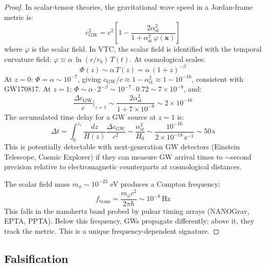 \documentclass[11pt,a4paper]{article}
\theoremstyle{definition}
\begin{document}
\begin{proof}
In scalar-tensor theories, the gravitational wave speed in a Jordan-frame metric is:
\begin{equation}
c_\mathrm{GW}^2 = c^2\left[1 - \frac{2\alpha_\mathrm{st}^2}{1 + \alpha_\mathrm{st}^2\,\varphi(\mathbf{x})}\right]
\end{equation}
where $\varphi$ is the scalar field. In VTC, the scalar field is identified with the temporal curvature field: $\varphi \equiv \alpha\,\ln(r/r_0)\,T(t)$. At cosmological scales:
\begin{equation}
\Phi(z) \sim \alpha\,T(z) = \alpha\,(1+z)^{-\beta}
\end{equation}
At $z = 0$: $\Phi = \alpha \sim 10^{-7}$, giving $c_\mathrm{GW}/c \approx 1 - \alpha_\mathrm{st}^2 \approx 1 - 10^{-16}$, consistent with GW170817. At $z = 1$: $\Phi \sim \alpha \cdot 2^{-\beta} \sim 10^{-7} \cdot 0.72 \sim 7 \times 10^{-8}$, and:
\begin{equation}
\frac{\Delta c_\mathrm{GW}}{c}\bigg|_{z=1} \sim \frac{2\alpha_\mathrm{st}^2}{1 + 7\times 10^{-8}} \sim 2\times 10^{-16}
\end{equation}
The accumulated time delay for a GW source at $z = 1$ is:
\begin{equation}
\Delta t = \int_0^{z_s} \frac{dz}{H(z)}\frac{\Delta c_\mathrm{GW}}{c^2} \sim \frac{\alpha_\mathrm{st}^2}{H_0} \sim \frac{10^{-16}}{2\times 10^{-18}\,\mathrm{s}^{-1}} \sim 50\,\mathrm{s}
\end{equation}
This is potentially detectable with next-generation GW detectors (Einstein Telescope, Cosmic Explorer) if they can measure GW arrival times to $\sim$second precision relative to electromagnetic counterparts at cosmological distances.

The scalar field mass $m_\phi \sim 10^{-23}$ eV produces a Compton frequency:
\begin{equation}
f_\mathrm{trans} = \frac{m_\phi c^2}{2\pi\hbar} \sim 10^{-8}\,\mathrm{Hz}
\end{equation}
This falls in the nanohertz band probed by pulsar timing arrays (NANOGrav, EPTA, PPTA). Below this frequency, GWs propagate differently; above it, they track the metric. This is a unique frequency-dependent signature.
\end{proof}

\subsection{Falsification}
\end{document}
